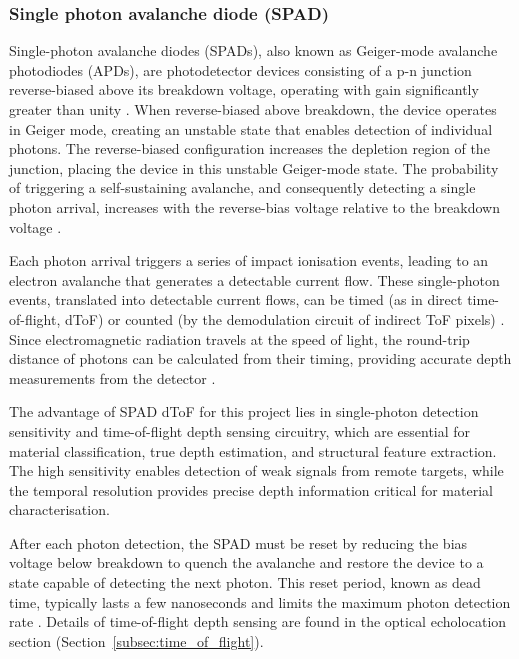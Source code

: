 \documentclass[12pt,a4paper,oneside]{report}
\begin{document}
\subsubsection{Single photon avalanche diode (SPAD)}
\label{subsubsec:spad}

Single-photon avalanche diodes (SPADs), also known as Geiger-mode avalanche photodiodes (APDs), are photodetector devices consisting of a p-n junction reverse-biased above its breakdown voltage, operating with gain significantly greater than unity \cite{piron2020}. When reverse-biased above breakdown, the device operates in Geiger mode, creating an unstable state that enables detection of individual photons. The reverse-biased configuration increases the depletion region of the junction, placing the device in this unstable Geiger-mode state. The probability of triggering a self-sustaining avalanche, and consequently detecting a single photon arrival, increases with the reverse-bias voltage relative to the breakdown voltage \cite{piron2020}.

Each photon arrival triggers a series of impact ionisation events, leading to an electron avalanche that generates a detectable current flow. These single-photon events, translated into detectable current flows, can be timed (as in direct time-of-flight, dToF) or counted (by the demodulation circuit of indirect ToF pixels) \cite{gyongy2022}. Since electromagnetic radiation travels at the speed of light, the round-trip distance of photons can be calculated from their timing, providing accurate depth measurements from the detector \cite{tachella2019}.

The advantage of SPAD dToF for this project lies in single-photon detection sensitivity and time-of-flight depth sensing circuitry, which are essential for material classification, true depth estimation, and structural feature extraction. The high sensitivity enables detection of weak signals from remote targets, while the temporal resolution provides precise depth information critical for material characterisation.

After each photon detection, the SPAD must be reset by reducing the bias voltage below breakdown to quench the avalanche and restore the device to a state capable of detecting the next photon. This reset period, known as dead time, typically lasts a few nanoseconds and limits the maximum photon detection rate \cite{piron2020}. Details of time-of-flight depth sensing are found in the optical echolocation section (Section~\ref{subsec:time_of_flight}).
\end{document}
